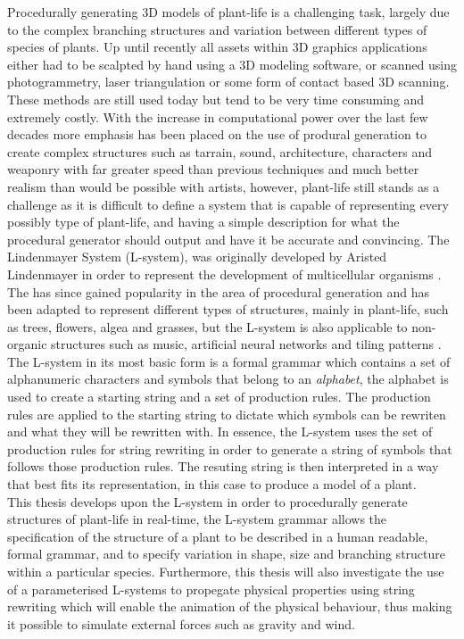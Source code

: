 

\lettrine[lines=3]{P}{}rocedurally generating 3D models of plant-life is a challenging task, largely due to the complex branching structures and variation between different types of species of plants. Up until recently all assets within 3D graphics applications either had to be scalpted by hand using a 3D modeling software, or scanned using photogrammetry, laser triangulation or some form of contact based 3D scanning. These methods are still used today but tend to be very time consuming and extremely costly. With the increase in computational power over the last few decades more emphasis has been placed on the use of produral generation to create complex structures such as tarrain, sound, architecture, characters and weaponry with far greater speed than previous techniques and much better realism than would be possible with artists, however, plant-life still stands as a challenge as it is difficult to define a system that is capable of representing every possibly type of plant-life, and having a simple description for what the procedural generator should output and have it be accurate and convincing. The Lindenmayer System (L-system), was originally developed by Aristed Lindenmayer in order to represent the development of multicellular organisms \cite{lindenmayer1968mathematical}. The has since gained popularity in the area of procedural generation and has been adapted to represent different types of structures, mainly in plant-life, such as trees, flowers, algea and grasses, but the L-system is also applicable to non-organic structures such as music, artificial neural networks and tiling patterns \cite{Prusinkiewicz1989}. The L-system in its most basic form is a formal grammar which contains a set of alphanumeric characters and symbols that belong to an \textit{alphabet}, the alphabet is used to create a starting string and a set of production rules. The production rules are applied to the starting string to dictate which symbols can be rewriten and what they will be rewritten with. In essence, the L-system uses the set of production rules for string rewriting in order to generate a string of symbols that follows those production rules. The resuting string is then interpreted in a way that best fits its representation, in this case to produce a model of a plant. \\

This thesis develops upon the L-system in order to procedurally generate structures of plant-life in real-time, the L-system grammar allows the specification of the structure of a plant to be described in a human readable, formal grammar, and to specify variation in shape, size and branching structure within a particular species. Furthermore, this thesis will also investigate the use of a parameterised L-systems to propegate physical properties using string rewriting which will enable the animation of the physical behaviour, thus making it possible to simulate external forces such as gravity and wind.




